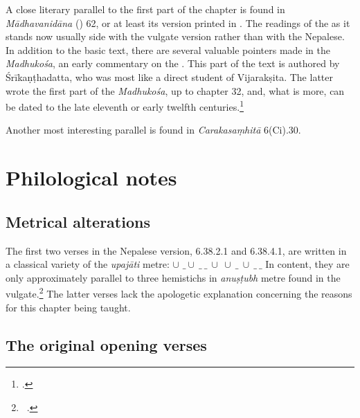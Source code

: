     A close literary parallel to the first part of the chapter is found
in \emph{Mādhavanidāna} (\cite{madhava}) 62, or at least its version
printed in \citet[361]{madhava}. The readings of the \cite{madhava}
as it stands now usually side with the vulgate version rather than
with the Nepalese. In addition to the basic text, there are several
valuable pointers made in the \emph{Madhukośa}, an early commentary
on the \cite{madhava}. This part of the text is authored by
Śrīkaṇṭhadatta, who was most like a direct student of Vijarakṣita.
The latter wrote the first part of the \emph{Madhukośa}, up to
chapter 32, and, what is more, can be dated to the late eleventh or
early twelfth centuries.\footcite[22--26]{meul-1974}
    
    Another most interesting parallel is found in \emph{Carakasaṃhitā} 6(Ci).30.
    
    
    \section{Philological notes}
    
    \subsection{Metrical alterations}
    
The first two verses in the Nepalese version, 6.38.2.1 and 6.38.4.1, are
written in a classical variety of the \emph{upajāti} metre:
\underline{$\cup$} $\_ \cup\ \_\ \_\ \cup\ \cup\ \_\ \cup\ \_\ \_$ In
content, they are only approximately parallel to three hemistichs in
\emph{anuṣṭubh} metre found in the vulgate.\footnote{\SS\
    .} The latter verses lack the apologetic explanation
    concerning the reasons for this chapter being taught.
        
\subsection{The original opening verses}

